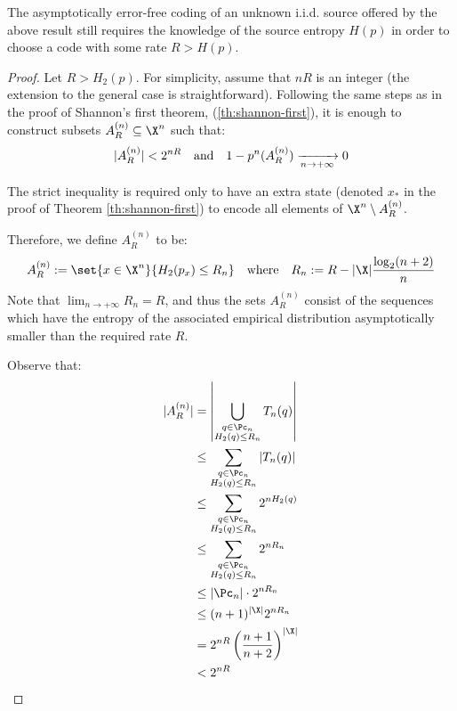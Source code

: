 \documentclass[toc]{../cs-classes/cs-classes}
\begin{document}
\begin{remark}
    The asymptotically error-free coding of an unknown i.i.d. source offered by the above result still requires the knowledge of the source entropy $H(p)$ in order to choose a code with some rate $R>H(p)$. 
\end{remark}

\begin{proof}
    Let $R>H_2(p)$. For simplicity, assume that $nR$ is an integer (the extension to the general case is straightforward). Following the same steps as in the proof of Shannon's first theorem, (\ref{th:shannon-first}), it is enough to construct subsets $A_R^{(n)}\subseteq\X^n$ such that:
    \begin{equation*}
        |A_R^{(n)}|<2^{nR} \quad \textnormal{and} \quad 1-p^n(A_R^{(n)}) \xrightarrow[n\to+\infty]{} 0
    \end{equation*}

    The strict inequality is required only to have an extra state (denoted $x_*$ in the proof of Theorem \ref{th:shannon-first}) to encode all elements of $\X^n\setminus A_R^{(n)}$.

    Therefore, we define $A_R^{(n)}$ to be:
    \begin{equation*}
        A_R^{(n)} := \set{x\in\X^n}{H_2(p_x)\leq R_n} \quad \textnormal{where} \quad R_n := R-|\X|\frac{\log_2(n+2)}{n}
    \end{equation*}
    Note that $\lim_{n\to+\infty}R_n=R$, and thus the sets $A_R^{(n)}$ consist of the sequences which have the entropy of the associated empirical distribution asymptotically smaller than the required rate $R$.

    Observe that:
    \begin{equation*}
        \begin{aligned}
            |A_R^{(n)}|&=\left|\bigcup_{\substack{q\in\Pc_n\\H_2(q)\leq R_n}}T_n(q)\right|\\
            &\leq \sum_{\substack{q\in\Pc_n\\H_2(q)\leq R_n}}|T_n(q)|\\
            &\leq \sum_{\substack{q\in\Pc_n\\H_2(q)\leq R_n}}2^{nH_2(q)}\\
            &\leq \sum_{\substack{q\in\Pc_n\\H_2(q)\leq R_n}}2^{nR_n}\\
            &\leq |\Pc_n|\cdot 2^{nR_n}\\
            &\leq (n+1)^{|\X|}2^{nR_n}\\
            &= 2^{nR}\left(\frac{n+1}{n+2}\right)^{|\X|}\\
            &< 2^{nR}
        \end{aligned}
    \end{equation*}


\end{proof}
\end{document}
